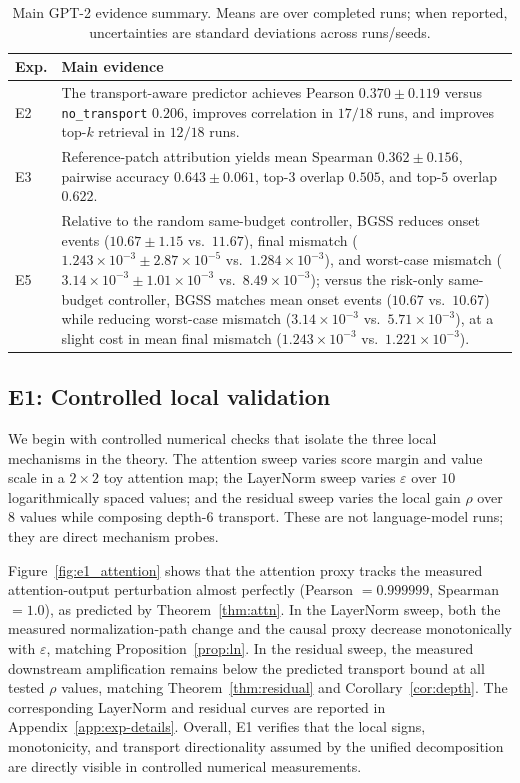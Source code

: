 \documentclass[twoside]{article}
\theoremstyle{definition}
\theoremstyle{remark}
\begin{document}
\begin{table}[t]
\centering
\caption{Main GPT-2 evidence summary. Means are over completed runs; when
reported, uncertainties are standard deviations across runs/seeds.}
\label{tab:gpt2_summary}
\scriptsize
\setlength{\tabcolsep}{3pt}
\renewcommand{\arraystretch}{0.98}
\begin{tabular}{@{}p{}p{}@{}}
\toprule
Exp. & Main evidence \\
\midrule
E2 & The transport-aware predictor achieves Pearson $0.370\pm0.119$ versus
\texttt{no\_transport} $0.206$, improves correlation in $17/18$ runs, and
improves top-$k$ retrieval in $12/18$ runs. \\
E3 & Reference-patch attribution yields mean Spearman
$0.362\pm0.156$, pairwise accuracy $0.643\pm0.061$, top-$3$ overlap
$0.505$, and top-$5$ overlap $0.622$. \\
E5 & Relative to the random same-budget controller, BGSS reduces onset events
($10.67\pm1.15$ vs.~$11.67$), final mismatch
($1.243\times 10^{-3}\pm 2.87\times 10^{-5}$ vs.~$1.284\times 10^{-3}$),
and worst-case mismatch
($3.14\times 10^{-3}\pm 1.01\times 10^{-3}$ vs.~$8.49\times 10^{-3}$); versus
the risk-only same-budget controller, BGSS matches mean onset events
($10.67$ vs.~$10.67$) while reducing worst-case mismatch
($3.14\times 10^{-3}$ vs.~$5.71\times 10^{-3}$), at a slight cost in mean
final mismatch ($1.243\times 10^{-3}$ vs.~$1.221\times 10^{-3}$). \\
\bottomrule
\end{tabular}
\end{table}

\subsection{E1: Controlled local validation}
\label{subsec:e1}

We begin with controlled numerical checks that isolate the three local
mechanisms in the theory. The attention sweep varies score margin and value
scale in a $2\times 2$ toy attention map; the LayerNorm sweep varies
$\varepsilon$ over $10$ logarithmically spaced values; and the residual sweep
varies the local gain $\rho$ over $8$ values while composing depth-$6$
transport. These are not language-model runs; they are direct mechanism probes.

Figure~\ref{fig:e1_attention} shows that the attention proxy tracks the
measured attention-output perturbation almost perfectly
(Pearson $=0.999999$, Spearman $=1.0$), as predicted by
Theorem~\ref{thm:attn}. In the LayerNorm sweep, both the measured
normalization-path change and the causal proxy decrease monotonically with
$\varepsilon$, matching Proposition~\ref{prop:ln}. In the residual sweep, the
measured downstream amplification remains below the predicted transport bound at
all tested $\rho$ values, matching Theorem~\ref{thm:residual} and
Corollary~\ref{cor:depth}. The corresponding LayerNorm and residual curves are
reported in Appendix~\ref{app:exp-details}. Overall, E1 verifies that the
local signs, monotonicity, and transport directionality assumed by the unified
decomposition are directly visible in controlled numerical measurements.
\end{document}
